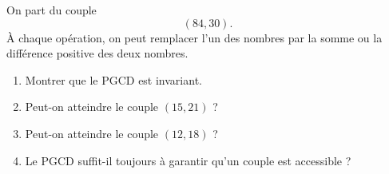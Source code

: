 On part du couple
\[
(84, 30).
\]
À chaque opération, on peut remplacer l'un des nombres par la somme ou la
différence positive des deux nombres.
\begin{enumerate}
  \item Montrer que le PGCD est invariant.
  \item Peut-on atteindre le couple $(15, 21)$ ?
  \item Peut-on atteindre le couple $(12, 18)$ ?
  \item Le PGCD suffit-il toujours à garantir qu'un couple est accessible ?
\end{enumerate}
